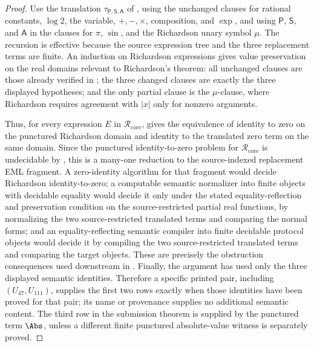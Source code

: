 \begin{proof}
Use the translation \(\tau_{\mathsf P,\mathsf S,\mathsf A}\) of
, using
the unchanged clauses for rational constants, \(\log2\), the variable,
\(+,-,\times\), composition, and \(\exp\), and using \(\mathsf P\),
\(\mathsf S\), and \(\mathsf A\) in the clauses for \(\pi\), \(\sin\), and the
Richardson unary symbol \(\mu\).  The recursion is effective because the source
expression tree and the three replacement terms are finite.  An induction on
Richardson expressions gives value preservation on the real domains relevant to
Richardson's theorem: all unchanged clauses are those already verified in
; the three changed clauses are exactly the
three displayed hypotheses; and the only partial clause is the \(\mu\)-clause,
where Richardson requires agreement with \(|x|\) only for nonzero arguments.

Thus, for every expression \(E\) in \(\mathcal R_{\mathrm{core}}\),
 gives the equivalence of
identity to zero on the punctured Richardson domain and identity to the
translated zero term on the same domain.  Since the punctured identity-to-zero
problem for \(\mathcal R_{\mathrm{core}}\) is undecidable by
, this is a many-one reduction to
the source-indexed replacement EML fragment.  A zero-identity algorithm for that
fragment would decide Richardson identity-to-zero; a computable semantic
normalizer into finite objects with decidable equality would decide it only under
the stated equality-reflection and preservation condition on the
source-restricted partial real functions, by normalizing the two source-restricted
translated terms and comparing the normal forms; and an equality-reflecting
semantic compiler into finite decidable protocol objects would decide it by
compiling the two source-restricted translated terms and comparing the target
objects.  These are precisely the
obstruction consequences used downstream in
.  Finally, the
argument has used only the three displayed semantic identities.  Therefore a
specific printed pair, including \((U_{47},U_{111})\), supplies the first two rows
exactly when those identities have been proved for that pair; its name or
provenance supplies no additional semantic content.  The third row in the
submission theorem is supplied by the punctured term \(\Abs\), unless a different
finite punctured absolute-value witness is separately proved.
\end{proof}

